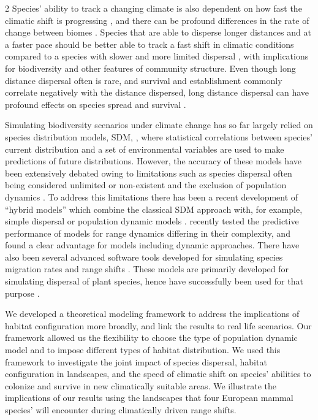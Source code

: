 \documentclass[12pt,pdftex]{article}
\begin{document}
\begin{spacing}{2}
Species' ability to track a changing climate is also dependent on how fast the climatic shift is progressing \citep{Schloss2012a}, and there can be profound differences in the rate of change between biomes \citep{Stocker2013, Loarie2009}. Species that are able to disperse longer distances and at a faster pace should be better able to track a fast shift in climatic conditions compared to a species with slower and more limited dispersal \citep{Walther2002, Angert2011}, with implications for biodiversity and other features of community structure. Even though long distance dispersal often is rare, and survival and establishment commonly correlate negatively with the distance dispersed, long distance dispersal can have profound effects on species spread and survival \citep{Nathan2006} . 

Simulating biodiversity scenarios under climate change has so far largely relied on species distribution models, SDM, \citep{Guisan2000, Thomas2006a}, where statistical correlations between species' current distribution and a set of environmental variables are used to make predictions of future distributions. However, the accuracy of these models have been extensively debated \citep{Thuiller2013, Araujo2012a, Wiens2009} owing to limitations such as species dispersal often being considered unlimited or non-existent \citep{Peterson2001, Thuiller2005a} and the exclusion of population dynamics \citep{Zurell2009}. To address this limitations there has been a recent development of ``hybrid models'' which combine the classical SDM approach with, for example, simple dispersal or population dynamic models \citep{Ehrlen2015}. \cite{Zurell2016} recently tested the predictive performance of  models for range dynamics differing in their complexity, and found a clear advantage for models including dynamic approaches. There have also been several advanced software tools developed for simulating species migration rates \citep{Collingham1996} and range shifts \citep{Midgley2010, Schumaker2013}. These models are primarily developed for simulating dispersal of plant species, hence have successfully been used for that purpose \citep{Perez-Garcia2017}. 

We developed a theoretical modeling framework to address the implications of habitat configuration more broadly, and link the results to real life scenarios. Our framework allowed us the flexibility to choose the type of population dynamic model and to impose different types of habitat distribution. We used this framework to investigate the joint impact of species dispersal, habitat configuration in landscapes, and the speed of climatic shift on species' abilities to colonize and survive in new climatically suitable areas. We illustrate the implications of our results using the landscapes that four European mammal species' will encounter during climatically driven range shifts.




\end{spacing}
\end{document}

